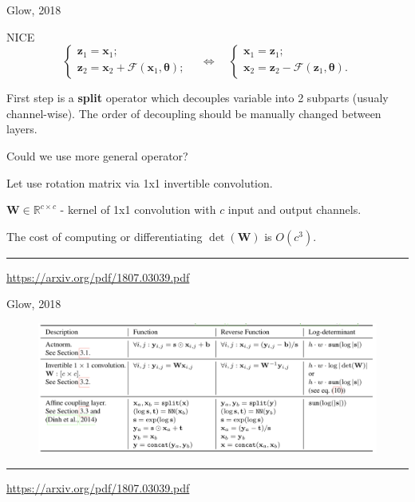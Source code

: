 \documentclass{beamer}
\newcommand{\bx}{\mathbf{x}}
\newcommand{\bz}{\mathbf{z}}
\newcommand{\btheta}{\boldsymbol{\theta}}
\begin{document}
\begin{frame}{Glow, 2018}
	
	\begin{block}{NICE}
		\vspace{-0.2cm}
		\begin{equation*}
			\begin{cases} \bz_1 = \bx_1; \\ \bz_2 = \bx_2 + \mathcal{F}(\bx_1, \btheta);\end{cases}  \quad \Leftrightarrow \quad 
			\begin{cases} \bx_1 = \bz_1; \\ \bx_2 = \bz_2 - \mathcal{F}(\bz_1, \btheta).\end{cases} 
		\end{equation*}
		\vspace{-0.2cm}
	\end{block}
	
	First step is a \textbf{split} operator which decouples variable into 2 subparts (usualy channel-wise).
	The order of decoupling should be manually changed between layers.
	
	Could we use more general operator?
	
	Let use rotation matrix via 1x1 invertible convolution.
	
	$\mathbf{W} \in \mathbb{R}^{c \times c}$ - kernel of 1x1 convolution with $c$ input and output channels.
	
	The cost of computing or differentiating $\det (\mathbf{W})$ is $O(c^3)$.
	
	\vfill
	\hrule\medskip
	{\scriptsize \href{https://arxiv.org/pdf/1807.03039.pdf}{https://arxiv.org/pdf/1807.03039.pdf}}    
\end{frame}
\begin{frame}{Glow, 2018}
	\begin{figure}
		\centering
		\includegraphics[width=\linewidth]{figs/glow_ops.png}
	\end{figure}
	\vfill
	\hrule\medskip
	{\scriptsize \href{https://arxiv.org/pdf/1807.03039.pdf}{https://arxiv.org/pdf/1807.03039.pdf}}    
\end{frame}
\end{document}
